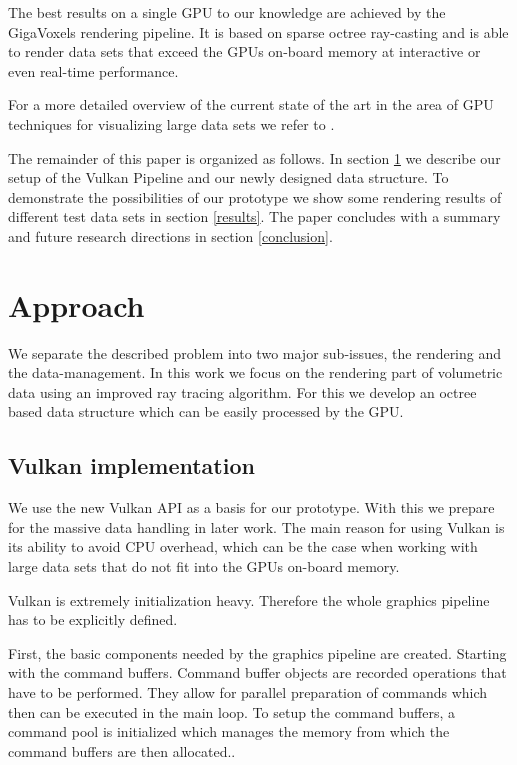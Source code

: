 \documentclass[12pt,conference]{IEEEtran}
\begin{document}
The best results on a single GPU to our knowledge are achieved by the GigaVoxels rendering pipeline\cite{crassin2009gigavoxels}. It is based on sparse octree ray-casting and is able to render data sets that exceed the GPUs on-board memory at interactive or even real-time performance.
\par
For a more detailed overview of the current state of the art in the area of GPU techniques for visualizing large data sets we refer to \cite{beyer2014survey}.
\par
The remainder of this paper is organized as follows. In section \ref{approach} we describe our setup of the Vulkan Pipeline and our newly designed data structure. To demonstrate the possibilities of our prototype we show some rendering results of different test data sets in section \ref{results}. The paper concludes with a summary and future research directions in section \ref{conclusion}.
\section{Approach}
\label{approach}
We separate the described problem into two major sub-issues, the rendering and the data-management. In this work we focus on the rendering part of volumetric data using an improved ray tracing algorithm. For this we develop an octree based data structure which can be easily processed by the GPU.  

\subsection{Vulkan implementation}
We use the new Vulkan API as a basis for our prototype. With this we prepare for the massive data handling in later work. The main reason for using Vulkan is its ability to avoid CPU overhead\cite{vulkan1.0.38spec}, which can be the case when working with large data sets that do not fit into the GPUs on-board memory.
\par
Vulkan is extremely initialization heavy. Therefore the whole graphics pipeline has to be explicitly defined. 

First, the basic components needed by the graphics pipeline are created. Starting with the command buffers. Command buffer objects are recorded operations that have to be performed. They allow for parallel preparation of commands which then can be executed in the main loop. To setup the command buffers, a command pool is initialized which manages the memory from which the command buffers are then allocated..
\end{document}
